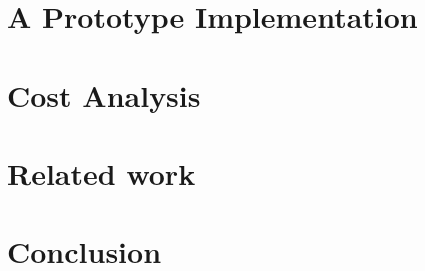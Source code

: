 \documentclass[runningheads]{llncs}
\begin{document}
\section{A Prototype Implementation}
\section{Cost Analysis}
\section{Related work}
\section{Conclusion}


\end{document}

